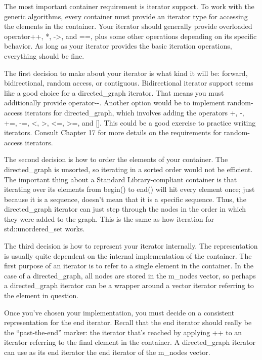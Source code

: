 
The most important container requirement is iterator support. To work with the generic algorithms, every container must provide an iterator type for accessing the elements in the container. Your iterator should generally provide overloaded operator++, *, ->, and ==, plus some other operations depending on its specific behavior. As long as your iterator provides the basic iteration operations, everything should be fine.

The first decision to make about your iterator is what kind it will be: forward, bidirectional, random access, or contiguous. Bidirectional iterator support seems like a good choice for a directed\_graph iterator. That means you must additionally provide operator-{}-. Another option would be to implement random-access iterators for directed\_graph, which involves adding the operators +, -, +=, -=, <, >, <=, >=, and []. This could be a good exercise to practice writing iterators. Consult Chapter 17 for more details on the requirements for random-access iterators.

The second decision is how to order the elements of your container. The directed\_graph is unsorted, so iterating in a sorted order would not be efficient. The important thing about a Standard Library-compliant container is that iterating over its elements from begin() to end() will hit every element once; just because it is a sequence, doesn’t mean that it is a specific sequence. Thus, the directed\_graph iterator can just step through the nodes in the order in which they were added to the graph. This is the same as how iteration for std::unordered\_set works.

The third decision is how to represent your iterator internally. The representation is usually quite dependent on the internal implementation of the container. The first purpose of an iterator is to refer to a single element in the container. In the case of a directed\_graph, all nodes are stored in the m\_nodes vector, so perhaps a directed\_graph iterator can be a wrapper around a vector iterator referring to the element in question.

Once you’ve chosen your implementation, you must decide on a consistent representation for the end iterator. Recall that the end iterator should really be the “past-the-end” marker: the iterator that’s reached by applying ++ to an iterator referring to the final element in the container. A directed\_graph iterator can use as its end iterator the end iterator of the m\_nodes vector.

